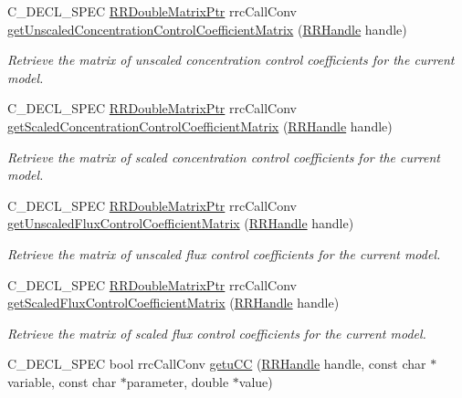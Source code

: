 \begin{DoxyCompactItemize}
C\+\_\+\+D\+E\+C\+L\+\_\+\+S\+P\+E\+C \hyperlink{rrc__types_8h_ae586a879d30f0823087e42d93464b5dd}{R\+R\+Double\+Matrix\+Ptr} rrc\+Call\+Conv \hyperlink{group__mca_ga98eca56a5da7035bcf55bce9fbed1e56}{get\+Unscaled\+Concentration\+Control\+Coefficient\+Matrix} (\hyperlink{rrc__types_8h_a1d68f0592372208fa5a5f2799ea4b3ae}{R\+R\+Handle} handle)
\begin{DoxyCompactList}\small\item\em Retrieve the matrix of unscaled concentration control coefficients for the current model. \end{DoxyCompactList}\item 
C\+\_\+\+D\+E\+C\+L\+\_\+\+S\+P\+E\+C \hyperlink{rrc__types_8h_ae586a879d30f0823087e42d93464b5dd}{R\+R\+Double\+Matrix\+Ptr} rrc\+Call\+Conv \hyperlink{group__mca_gaea6b9bb323f08262796f3c82a71b43c1}{get\+Scaled\+Concentration\+Control\+Coefficient\+Matrix} (\hyperlink{rrc__types_8h_a1d68f0592372208fa5a5f2799ea4b3ae}{R\+R\+Handle} handle)
\begin{DoxyCompactList}\small\item\em Retrieve the matrix of scaled concentration control coefficients for the current model. \end{DoxyCompactList}\item 
C\+\_\+\+D\+E\+C\+L\+\_\+\+S\+P\+E\+C \hyperlink{rrc__types_8h_ae586a879d30f0823087e42d93464b5dd}{R\+R\+Double\+Matrix\+Ptr} rrc\+Call\+Conv \hyperlink{group__mca_ga50d5f6aabac3cd1801c471845b191297}{get\+Unscaled\+Flux\+Control\+Coefficient\+Matrix} (\hyperlink{rrc__types_8h_a1d68f0592372208fa5a5f2799ea4b3ae}{R\+R\+Handle} handle)
\begin{DoxyCompactList}\small\item\em Retrieve the matrix of unscaled flux control coefficients for the current model. \end{DoxyCompactList}\item 
C\+\_\+\+D\+E\+C\+L\+\_\+\+S\+P\+E\+C \hyperlink{rrc__types_8h_ae586a879d30f0823087e42d93464b5dd}{R\+R\+Double\+Matrix\+Ptr} rrc\+Call\+Conv \hyperlink{group__mca_ga72cf127d1cc36b55786c2700fc53182b}{get\+Scaled\+Flux\+Control\+Coefficient\+Matrix} (\hyperlink{rrc__types_8h_a1d68f0592372208fa5a5f2799ea4b3ae}{R\+R\+Handle} handle)
\begin{DoxyCompactList}\small\item\em Retrieve the matrix of scaled flux control coefficients for the current model. \end{DoxyCompactList}\item 
C\+\_\+\+D\+E\+C\+L\+\_\+\+S\+P\+E\+C bool rrc\+Call\+Conv \hyperlink{group__mca_gae9f84e6ea3736a774eecd6e9585299b4}{getu\+C\+C} (\hyperlink{rrc__types_8h_a1d68f0592372208fa5a5f2799ea4b3ae}{R\+R\+Handle} handle, const char $\ast$variable, const char $\ast$parameter, double $\ast$value)

\end{DoxyCompactItemize}
